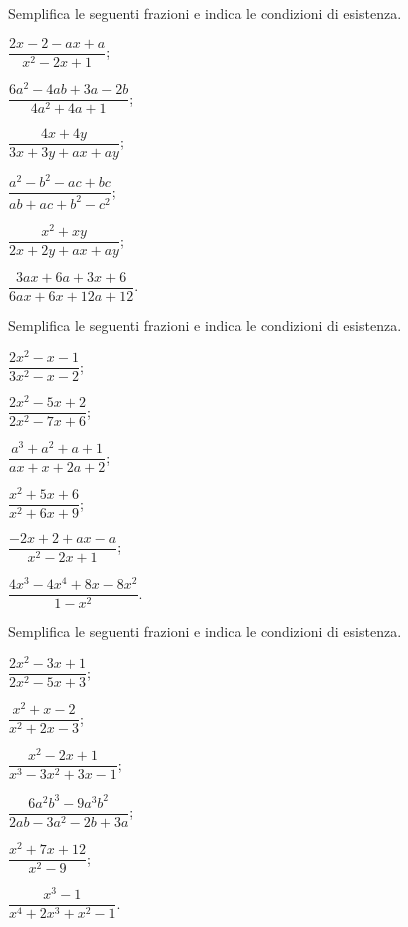 \begin{esercizio}[\Ast]
\label{ese:19.6}
Semplifica le seguenti frazioni e indica le condizioni di esistenza.
\begin{multicols}{3}
\begin{enumeratea}
 \item $\dfrac{2x-2-ax+a}{x^{2}-2x+1}$;
 \item $\dfrac{6a^{2}-4ab+3a-2b}{4a^{2}+4a+1}$;
 \item $\dfrac{4x+4y}{3x+3y+ax+ay}$;
 \item $\dfrac{a^{2}-b^{2}-ac+bc}{ab+ac+b^{2}-c^{2}}$;
 \item $\dfrac{x^{2}+xy}{2x+2y+ax+ay}$;
 \item $\dfrac{3ax+6a+3x+6}{6ax+6x+12a+12}$.
\end{enumeratea}
\end{multicols}
\end{esercizio}
\begin{esercizio}[\Ast]
\label{ese:19.7}
Semplifica le seguenti frazioni e indica le condizioni di esistenza.
\begin{multicols}{3}
\begin{enumeratea}
 \item $\dfrac{2x^{2}-x-1}{3x^{2}-x-2}$;
 \item $\dfrac{2x^{2}-5x+2}{2x^{2}-7x+6}$;
 \item $\dfrac{a^{3}+a^{2}+a+1}{ax+x+2a+2}$;
 \item $\dfrac{x^{2}+5x+6}{x^{2}+6x+9}$;
 \item $\dfrac{-2x+2+ax-a}{x^{2}-2x+1}$;
 \item $\dfrac{4x^{3}-4x^{4}+8x-8x^{2}}{1-x^{2}}$.
\end{enumeratea}
\end{multicols}
\end{esercizio}

\begin{esercizio}[\Ast]
\label{ese:19.8}
Semplifica le seguenti frazioni e indica le condizioni di esistenza.
\begin{multicols}{3}
\begin{enumeratea}
 \item $\dfrac{2x^{2}-3x+1}{2x^{2}-5x+3}$;
 \item $\dfrac{x^{2}+x-2}{x^{2}+2x-3}$;
 \item $\dfrac{x^{2}-2x+1}{x^{3}-3x^{2}+3x-1}$;
 \item $\dfrac{6a^{2}b^{3}-9a^{3}b^{2}}{2ab-3a^{2}-2b+3a}$;
 \item $\dfrac{x^{2}+7x+12}{x^{2}-9}$;
 \item $\dfrac{x^{3}-1}{x^{4}+2x^{3}+x^{2}-1}$.
\end{enumeratea}
\end{multicols}
\end{esercizio}

